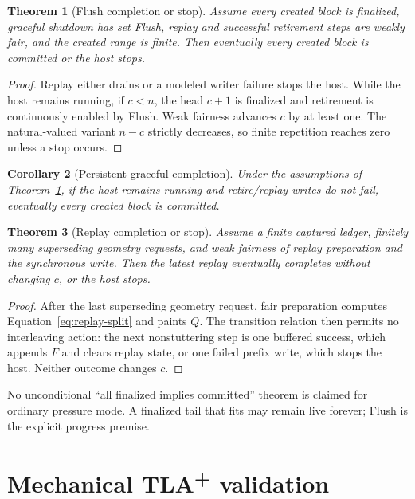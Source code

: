 \documentclass[11pt]{article}
\newtheorem{theorem}{Theorem}[section]
\newtheorem{corollary}[theorem]{Corollary}
\theoremstyle{definition}
\begin{document}
\begin{theorem}[Flush completion or stop]
\label{thm:flush}
Assume every created block is finalized, graceful shutdown has set Flush,
replay and successful retirement steps are weakly fair, and the created range
is finite.  Then eventually every created block is committed or the host
stops.
\end{theorem}

\begin{proof}
Replay either drains or a modeled writer failure stops the host.  While the
host remains running, if $c<n$, the head $c+1$ is finalized and retirement is
continuously enabled by Flush.  Weak fairness advances $c$ by at least one.
The natural-valued variant $n-c$ strictly decreases, so finite repetition
reaches zero unless a stop occurs.
\end{proof}

\begin{corollary}[Persistent graceful completion]
Under the assumptions of Theorem~\ref{thm:flush}, if the host remains running
and retire/replay writes do not fail, eventually every created block is
committed.
\end{corollary}

\begin{theorem}[Replay completion or stop]
Assume a finite captured ledger, finitely many superseding geometry requests,
and weak fairness of replay preparation and the synchronous write.  Then the
latest replay eventually completes without changing $c$, or the host stops.
\end{theorem}

\begin{proof}
After the last superseding geometry request, fair preparation computes
Equation~\eqref{eq:replay-split} and paints $Q$.  The transition relation then
permits no interleaving action: the next nonstuttering step is one buffered
success, which appends $F$ and clears replay state, or one failed prefix write,
which stops the host.  Neither outcome changes $c$.
\end{proof}

No unconditional ``all finalized implies committed'' theorem is claimed for
ordinary pressure mode.  A finalized tail that fits may remain live forever;
Flush is the explicit progress premise.

\section{Mechanical TLA\texorpdfstring{\textsuperscript{+}}{+} validation}
\label{sec:tla}
\end{document}
